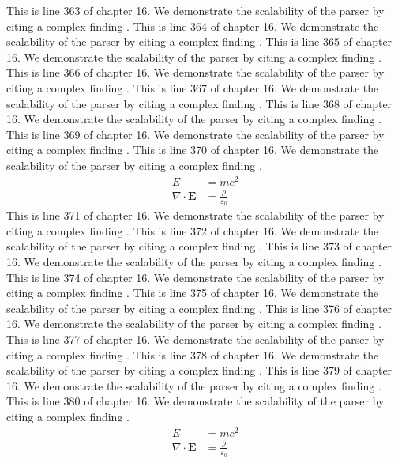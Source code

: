 This is line 363 of chapter 16. We demonstrate the scalability of the parser by citing a complex finding \cite{ref16_363}.
This is line 364 of chapter 16. We demonstrate the scalability of the parser by citing a complex finding \cite{ref16_364}.
This is line 365 of chapter 16. We demonstrate the scalability of the parser by citing a complex finding \cite{ref16_365}.
This is line 366 of chapter 16. We demonstrate the scalability of the parser by citing a complex finding \cite{ref16_366}.
This is line 367 of chapter 16. We demonstrate the scalability of the parser by citing a complex finding \cite{ref16_367}.
This is line 368 of chapter 16. We demonstrate the scalability of the parser by citing a complex finding \cite{ref16_368}.
This is line 369 of chapter 16. We demonstrate the scalability of the parser by citing a complex finding \cite{ref16_369}.
This is line 370 of chapter 16. We demonstrate the scalability of the parser by citing a complex finding \cite{ref16_370}.
\begin{align*}
  E &= mc^2 \\
  \nabla \cdot \mathbf{E} &= \frac{\rho}{\varepsilon_0}
\end{align*}
This is line 371 of chapter 16. We demonstrate the scalability of the parser by citing a complex finding \cite{ref16_371}.
This is line 372 of chapter 16. We demonstrate the scalability of the parser by citing a complex finding \cite{ref16_372}.
This is line 373 of chapter 16. We demonstrate the scalability of the parser by citing a complex finding \cite{ref16_373}.
This is line 374 of chapter 16. We demonstrate the scalability of the parser by citing a complex finding \cite{ref16_374}.
This is line 375 of chapter 16. We demonstrate the scalability of the parser by citing a complex finding \cite{ref16_375}.
This is line 376 of chapter 16. We demonstrate the scalability of the parser by citing a complex finding \cite{ref16_376}.
This is line 377 of chapter 16. We demonstrate the scalability of the parser by citing a complex finding \cite{ref16_377}.
This is line 378 of chapter 16. We demonstrate the scalability of the parser by citing a complex finding \cite{ref16_378}.
This is line 379 of chapter 16. We demonstrate the scalability of the parser by citing a complex finding \cite{ref16_379}.
This is line 380 of chapter 16. We demonstrate the scalability of the parser by citing a complex finding \cite{ref16_380}.
\begin{align*}
  E &= mc^2 \\
  \nabla \cdot \mathbf{E} &= \frac{\rho}{\varepsilon_0}
\end{align*}
